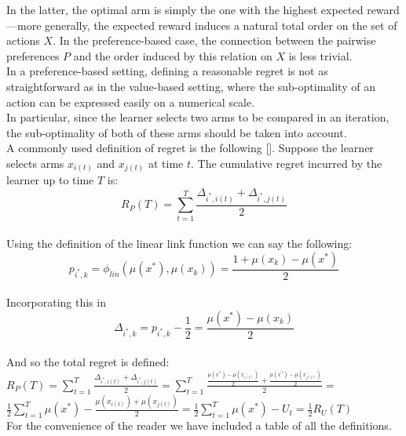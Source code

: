 \documentclass{llncs}
\begin{document}
In the latter, the optimal arm is simply the one with the highest expected
reward—more generally, the expected reward induces a natural total order on the set of actions $X$. 
In the preference-based case, the connection between the pairwise preferences $P$ and the order induced by this relation on $X$ is less trivial.
\\
In a preference-based setting, defining a reasonable regret is not as straightforward as in the value-based setting, where the sub-optimality of an action can be expressed easily on a numerical scale. 
\\
In particular, since the learner selects two arms to be compared in an iteration, the sub-optimality of both of these arms should be taken into account.
\\
A commonly used definition of regret is the following []. Suppose the learner selects arms $x_{i(t)}$ and $x_{j(t)}$ at time $t$. The cumulative regret incurred by the learner up to time $T$ is:
$$ R_P(T) = \sum_{t=1}^T \frac{\Delta_{i^*,i(t)}+\Delta_{i^*,j(t)}}{2} $$
\\
Using the definition of the linear link function we can say the following: $$ p_{i^*,k} = \phi_{lin}(\mu(x^*),\mu(x_k)) = 
\frac{1 +\mu(x_k)-\mu(x^*)}{2}$$
\\
Incorporating this in 
$$\Delta_{i^*,k} = p_{i^*,k} - \frac{1}{2} = \frac{\mu(x^*)-\mu(x_k)}{2}$$\\
And so the total regret is defined:\\
$ R_P(T) = \sum_{t=1}^T \frac{\Delta_{i^*,i(t)}+\Delta_{i^*,j(t)}}{2} =  
\sum_{t=1}^T \frac{\frac{\mu(x^*)-\mu(x_{i(t)})}{2}+\frac{\mu(x^*)-\mu(x_{j(t)})}{2}}{2} =
$
\\
$
\frac{1}{2} \sum_{t=1}^T \mu(x^*) -\frac{
	\mu(x_{i(t)})+\mu(x_{j(t)})}{2} =
\frac{1}{2} \sum_{t=1}^T \mu(x^*)- U_t = \frac{1}{2}R_U(T)$
\\
For the convenience of the reader we have included a table of all the definitions. 
\end{document}
